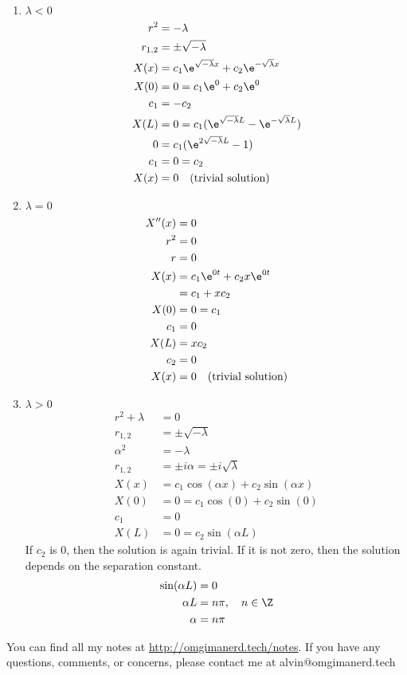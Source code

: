 \documentclass{math}
\begin{document}
\begin{enumerate}
  \item \( \lambda < 0 \)
  \begin{align*}
    r^2 &= -\lambda \\
    r_{1,2} &= \pm\sqrt{-\lambda} \\
    X(x) &= c_1\e^{\sqrt{-\lambda}x}+c_2\e^{-\sqrt{\lambda}x} \\
    X(0) &= 0 = c_1\e^{0}+c_2\e^{0} \\
    c_1 &= -c_2 \\
    X(L) &= 0 = c_1(\e^{\sqrt{-\lambda}L}-\e^{-\sqrt{\lambda}L}) \\
    0 &= c_1(\e^{2\sqrt{-\lambda}L}-1) \\
    c_1 &= 0 = c_2 \\
    X(x) &= 0 \quad \text{(trivial solution)}
  \end{align*}
  \item \( \lambda = 0 \)
  \begin{align*}
    X''(x) &= 0 \\
    r^2 &= 0 \\
    r &= 0 \\
    X(x) &= c_1\e^{0t}+c_2x\e^{0t} \\
    &= c_1+xc_2 \\
    X(0) &= 0 = c_1 \\
    c_1 &= 0 \\
    X(L) &= xc_2 \\
    c_2 &= 0 \\
    X(x) &= 0 \quad \text{(trivial solution)}
  \end{align*}
  \item \( \lambda > 0 \)
  \begin{align*}
    r^2+\lambda &= 0 \\
    r_{1,2} &= \pm\sqrt{-\lambda} \\
    \alpha^2 &= -\lambda \\
    r_{1,2} &= \pm i\alpha = \pm i\sqrt{\lambda} \\
    X(x) &= c_1\cos(\alpha x)+c_2\sin(\alpha x) \\
    X(0) &= 0 = c_1\cos(0)+c_2\sin(0) \\
    c_1 &= 0 \\
    X(L) &= 0 = c_2\sin(\alpha L)
  \end{align*}
  If \( c_2 \) is 0, then the solution is again trivial. If it is not zero,
  then the solution depends on the separation constant.
  \begin{align*}
    \sin(\alpha L) &= 0 \\
    \alpha L &= n\pi, \quad n\in\Z \\
    \alpha &= n\pi
  \end{align*}
\end{enumerate}

\begin{center}
  You can find all my notes at \url{http://omgimanerd.tech/notes}. If you have
  any questions, comments, or concerns, please contact me at
  alvin@omgimanerd.tech
\end{center}
\end{document}
